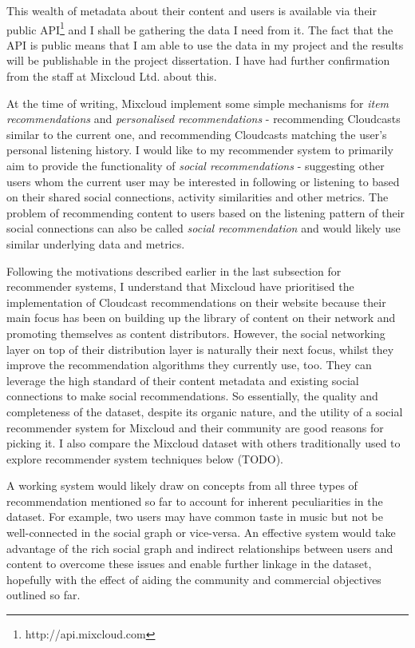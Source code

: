 This wealth of metadata about their content and users is available via their public API\footnote{http://api.mixcloud.com} and I shall be gathering the data I need from it. The fact that the API is public means that I am able to use the data in my project and the results will be publishable in the project dissertation. I have had further confirmation from the staff at Mixcloud Ltd. about this.

At the time of writing, Mixcloud implement some simple mechanisms for \emph{item recommendations} and \emph{personalised recommendations} - recommending Cloudcasts similar to the current one, and recommending Cloudcasts matching the user's personal listening history. I would like to my recommender system to primarily aim to provide the functionality of \emph{social recommendations} - suggesting other users whom the current user may be interested in following or listening to based on their shared social connections, activity similarities and other metrics. The problem of recommending content to users based on the listening pattern of their social connections can also be called \emph{social recommendation} and would likely use similar underlying data and metrics. 

Following the motivations described earlier in the last subsection for recommender systems, I understand that Mixcloud have prioritised the implementation of Cloudcast recommendations on their website because their main focus has been on building up the library of content on their network and promoting themselves as content distributors. However, the social networking layer on top of their distribution layer is naturally their next focus, whilst they improve the recommendation algorithms they currently use, too. They can leverage the high standard of their content metadata and existing social connections to make social recommendations. So essentially, the quality and completeness of the dataset, despite its organic nature, and the utility of a social recommender system for Mixcloud and their community are good reasons for picking it. I also compare the Mixcloud dataset with others traditionally used to explore recommender system techniques below (TODO).

A working system would likely draw on concepts from all three types of recommendation mentioned so far to account for inherent peculiarities in the dataset. For example, two users may have common taste in music but not be well-connected in the social graph or vice-versa. An effective system would take advantage of the rich social graph and indirect relationships between users and content to overcome these issues and enable further linkage in the dataset, hopefully with the effect of aiding the community and commercial objectives outlined so far.


